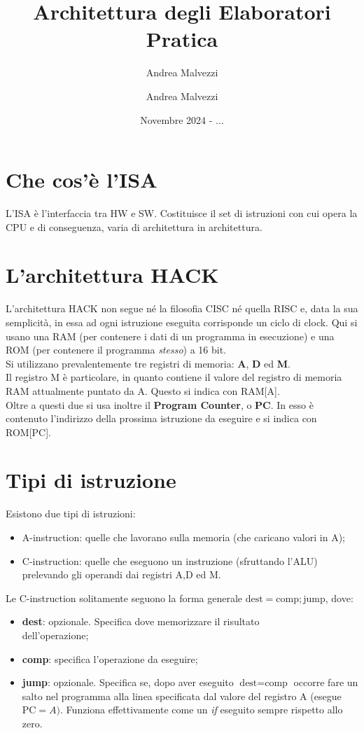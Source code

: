 \documentclass[12pt]{article}
\author{Andrea Malvezzi}
\title{\textbf{Architettura degli Elaboratori\\ Pratica}}
\date{Novembre 2024 - $\dots$}
\author{Andrea Malvezzi}
\begin{document}
\maketitle
\pagebreak
\tableofcontents
\pagebreak

\section{Che cos'è l'ISA}
\label{sec:whats_ISA}
L'ISA è l'interfaccia tra HW e SW.
Costituisce il set di istruzioni con cui opera la CPU e di conseguenza, varia di architettura in architettura.

\section{L'architettura HACK}
\label{sec:HACK_architecture}
L'architettura HACK non segue né la filosofia CISC né quella RISC e, data la sua semplicità, in essa ad ogni istruzione eseguita corrisponde un ciclo di clock.
Qui si usano una RAM (per contenere i dati di un programma in esecuzione) e una ROM (per contenere il programma \textit{stesso}) a 16 bit. \\
Si utilizzano prevalentemente tre registri di memoria: \textbf{A}, \textbf{D} ed \textbf{M}.
\\Il registro M è particolare, in quanto contiene il valore del registro di memoria RAM attualmente puntato da A. Questo si indica con RAM[A]. \\
Oltre a questi due si usa inoltre il \textbf{Program Counter}, o \textbf{PC}. In esso è contenuto l'indirizzo della prossima istruzione da eseguire e si indica con ROM[PC].

\section{Tipi di istruzione}
\label{sec:tipi_istruzione}
Esistono due tipi di istruzioni:
\begin{itemize}
    \item A-instruction: quelle che lavorano sulla memoria (che caricano valori in A);
    \item C-instruction: quelle che eseguono un instruzione (sfruttando l'ALU) prelevando gli operandi dai registri A,D ed M.
\end{itemize}
Le C-instruction solitamente seguono la forma generale $\text{dest} = \text{comp}; \text{jump}$, dove:
\begin{itemize}
    \item \textbf{dest}: opzionale. Specifica dove memorizzare il risultato\\dell'operazione;
    \item \textbf{comp}: specifica l'operazione da eseguire;
    \item \textbf{jump}: opzionale. Specifica se, dopo aver eseguito $\text{dest} = \text{comp}$ occorre fare un salto nel programma alla linea specificata dal valore del registro A (esegue $\text{PC} = A)$. Funziona effettivamente come un \textit{if} eseguito sempre rispetto allo zero. 
\end{itemize}
\end{document}
